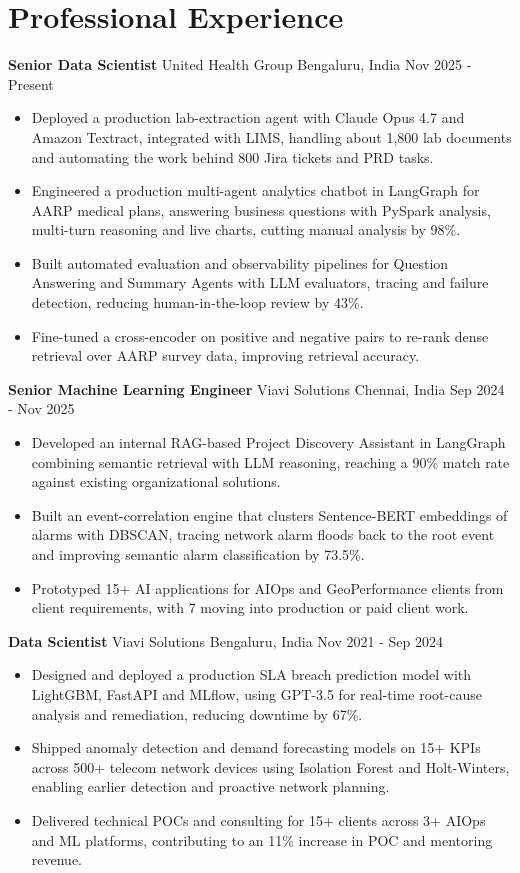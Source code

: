 \documentclass[10pt,a4paper]{article}
\newcommand{\role}[4]{\textbf{#1} \textbar{} #2 \hfill #3 \textbar{} #4\par}
\begin{document}
\section{Professional Experience}
\role{Senior Data Scientist}{United Health Group}{Bengaluru, India}{Nov 2025 - Present}
\begin{itemize}
  \item Deployed a production lab-extraction agent with Claude Opus 4.7 and Amazon Textract, integrated with LIMS, handling about 1,800 lab documents and automating the work behind 800 Jira tickets and PRD tasks.
  \item Engineered a production multi-agent analytics chatbot in LangGraph for AARP medical plans, answering business questions with PySpark analysis, multi-turn reasoning and live charts, cutting manual analysis by 98\%.
  \item Built automated evaluation and observability pipelines for Question Answering and Summary Agents with LLM evaluators, tracing and failure detection, reducing human-in-the-loop review by 43\%.
  \item Fine-tuned a cross-encoder on positive and negative pairs to re-rank dense retrieval over AARP survey data, improving retrieval accuracy.
\end{itemize}
\vspace{3pt}
\role{Senior Machine Learning Engineer}{Viavi Solutions}{Chennai, India}{Sep 2024 - Nov 2025}
\begin{itemize}
  \item Developed an internal RAG-based Project Discovery Assistant in LangGraph combining semantic retrieval with LLM reasoning, reaching a 90\% match rate against existing organizational solutions.
  \item Built an event-correlation engine that clusters Sentence-BERT embeddings of alarms with DBSCAN, tracing network alarm floods back to the root event and improving semantic alarm classification by 73.5\%.
  \item Prototyped 15+ AI applications for AIOps and GeoPerformance clients from client requirements, with 7 moving into production or paid client work.
\end{itemize}
\vspace{3pt}
\role{Data Scientist}{Viavi Solutions}{Bengaluru, India}{Nov 2021 - Sep 2024}
\begin{itemize}
  \item Designed and deployed a production SLA breach prediction model with LightGBM, FastAPI and MLflow, using GPT-3.5 for real-time root-cause analysis and remediation, reducing downtime by 67\%.
  \item Shipped anomaly detection and demand forecasting models on 15+ KPIs across 500+ telecom network devices using Isolation Forest and Holt-Winters, enabling earlier detection and proactive network planning.
  \item Delivered technical POCs and consulting for 15+ clients across 3+ AIOps and ML platforms, contributing to an 11\% increase in POC and mentoring revenue.
\end{itemize}
\end{document}
